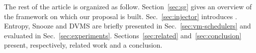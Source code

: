 The rest of the article is
organized as follow.
Section~\ref{sec:sg} gives an overview of the \sg
framework on which our proposal is built. Sec.~\ref{sec:injector}
introduces \vmps.
Entropy, Snooze and DVMS are briefly presented in
Sec.~\ref{sec:vm-schedulers} and evaluated in
Sec.~\ref{sec:experiments}. Sections~\ref{sec:related}
and~\ref{sec:conclusion} present, respectively, related work and a
conclusion.



